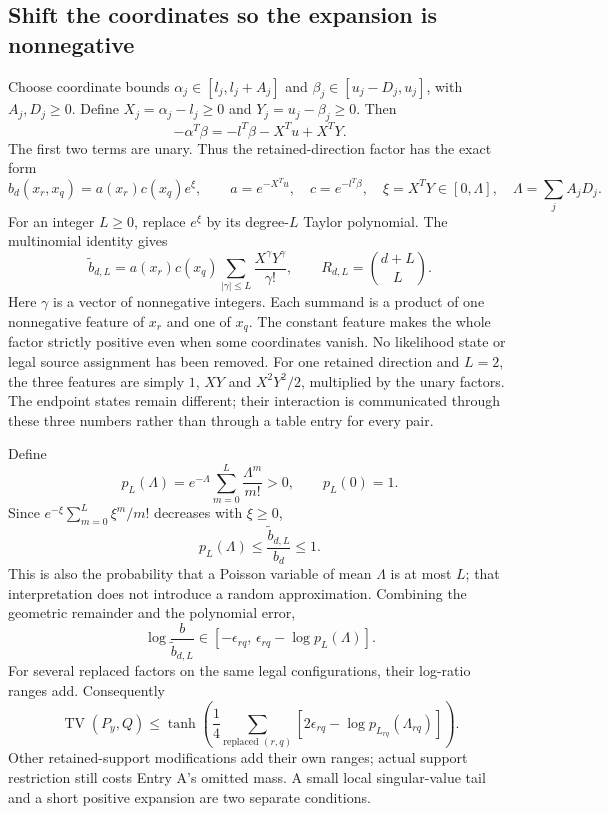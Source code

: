 \documentclass[10pt,a4paper]{article}
\newcommand{\TV}{\operatorname{TV}}
\begin{document}
\subsection{Shift the coordinates so the expansion is nonnegative}
Choose coordinate bounds
$\alpha_j\in[l_j,l_j+A_j]$ and $\beta_j\in[u_j-D_j,u_j]$, with $A_j,D_j\geq0$.
Define $X_j=\alpha_j-l_j\geq0$ and $Y_j=u_j-\beta_j\geq0$. Then
\[
 -\alpha^T\beta=-l^T\beta-X^Tu+X^TY.
\]
The first two terms are unary. Thus the retained-direction factor has the exact form
\begin{equation}
 b_d(x_r,x_q)=a(x_r)c(x_q)e^\xi,\qquad
 a=e^{-X^Tu},\quad c=e^{-l^T\beta},\quad
 \xi=X^TY\in[0,\Lambda],\quad \Lambda=\sum_jA_jD_j.
 \label{eq:positive-feature-origin}
\end{equation}
For an integer $L\geq0$, replace $e^\xi$ by its degree-$L$ Taylor polynomial. The multinomial identity gives
\begin{equation}
 \widetilde b_{d,L}
 =a(x_r)c(x_q)\sum_{|\gamma|\leq L}\frac{X^\gamma Y^\gamma}{\gamma!},
 \qquad R_{d,L}=\binom{d+L}{L}.
 \label{eq:positive-features}
\end{equation}
Here $\gamma$ is a vector of nonnegative integers. Each summand is a product of one nonnegative feature
of $x_r$ and one of $x_q$. The constant feature makes the whole factor strictly positive even when some
coordinates vanish. No likelihood state or legal source assignment has been removed.
For one retained direction and $L=2$, the three features are simply
$1$, $XY$ and $X^2Y^2/2$, multiplied by the unary factors. The endpoint states remain different; their
interaction is communicated through these three numbers rather than through a table entry for every pair.

Define
\[
 p_L(\Lambda)=e^{-\Lambda}\sum_{m=0}^L\frac{\Lambda^m}{m!}>0,\qquad p_L(0)=1.
\]
Since $e^{-\xi}\sum_{m=0}^L\xi^m/m!$ decreases with $\xi\geq0$,
\begin{equation}
 p_L(\Lambda)\leq\frac{\widetilde b_{d,L}}{b_d}\leq1.
 \label{eq:feature-ratio}
\end{equation}
This is also the probability that a Poisson variable of mean $\Lambda$ is at most $L$; that interpretation
does not introduce a random approximation. Combining the geometric remainder and the polynomial error,
\[
 \log\frac{b}{\widetilde b_{d,L}}
 \in[-\epsilon_{rq},\,\epsilon_{rq}-\log p_L(\Lambda)].
\]
For several replaced factors on the same legal configurations, their log-ratio ranges add. Consequently
\begin{equation}
 \TV(P_y,Q)\leq
 \tanh\!\left(\frac14\sum_{\text{replaced }(r,q)}
       [2\epsilon_{rq}-\log p_{L_{rq}}(\Lambda_{rq})]\right).
 \label{eq:feature-tv}
\end{equation}
Other retained-support modifications add their own ranges; actual support restriction still costs Entry A's
omitted mass. A small local singular-value tail and a short positive expansion are two separate conditions.
\end{document}

